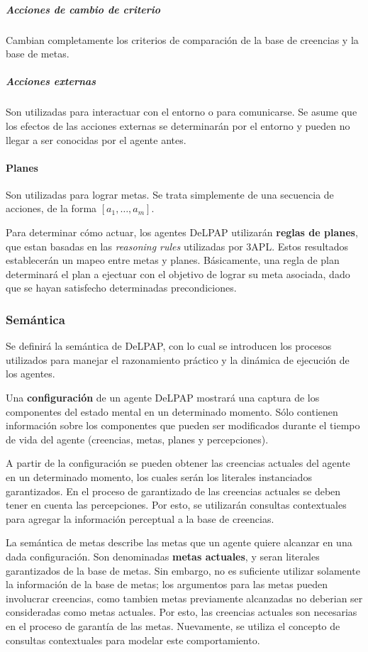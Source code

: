 \subparagraph{Acciones de cambio de criterio}

Cambian completamente los criterios de comparación de la base de creencias y la base de metas.

\subparagraph{Acciones externas}

Son utilizadas para interactuar con el entorno o para comunicarse. Se asume que los efectos de las acciones externas se determinarán por el entorno y pueden no llegar a ser conocidas por el agente antes.

\paragraph{Planes}

Son utilizadas para lograr metas. Se trata simplemente de una secuencia de acciones, de la forma 
$[a_1,\ldots,a_m]$. 

Para determinar cómo actuar, los agentes DeLPAP utilizarán
\textbf{reglas de planes}, que estan basadas en las \textit{reasoning rules} utilizadas por 3APL.
Estos resultados establecerán un mapeo entre metas y planes. Básicamente, una regla de plan
determinará el plan a ejectuar con el objetivo de lograr su meta asociada, dado que se hayan
satisfecho determinadas precondiciones.

\subsubsection{Semántica}

Se definirá la semántica de DeLPAP, con lo cual se introducen los procesos utilizados para manejar
el razonamiento práctico y la dinámica de ejecución de los agentes.

Una \textbf{configuración} de un agente DeLPAP mostrará una captura de los componentes del estado 
mental en un determinado momento. Sólo contienen información sobre los componentes que pueden ser 
modificados durante el tiempo de vida del agente (creencias, metas, planes y percepciones).

A partir de la configuración se pueden obtener las creencias actuales del agente en un determinado 
momento, los cuales serán los literales instanciados garantizados. En el proceso de garantizado de las
creencias actuales se deben tener en cuenta las percepciones. Por esto, se utilizarán consultas 
contextuales para agregar la información perceptual a la base de creencias.

La semántica de metas describe las metas que un agente quiere alcanzar en una dada configuración. 
Son denominadas \textbf{metas actuales}, y seran literales garantizados de la base de metas. Sin 
embargo, no es suficiente utilizar solamente la información de la base de metas; los argumentos para
las metas pueden involucrar creencias, como tambien metas previamente alcanzadas no deberian ser 
consideradas como metas actuales. Por esto, las creencias actuales son necesarias en el proceso de 
garantía de las metas. Nuevamente, se utiliza el concepto de consultas contextuales para modelar este
comportamiento.


